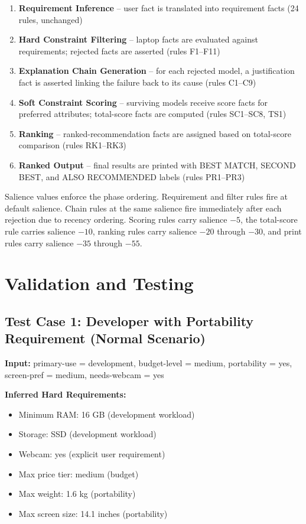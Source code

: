 \documentclass[12pt,a4paper]{article}
\begin{document}
\begin{enumerate}
    \item \textbf{Requirement Inference} -- user fact is translated into requirement facts (24 rules, unchanged)
    \item \textbf{Hard Constraint Filtering} -- laptop facts are evaluated against requirements; rejected facts are asserted (rules F1--F11)
    \item \textbf{Explanation Chain Generation} -- for each rejected model, a justification fact is asserted linking the failure back to its cause (rules C1--C9)
    \item \textbf{Soft Constraint Scoring} -- surviving models receive score facts for preferred attributes; total-score facts are computed (rules SC1--SC8, TS1)
    \item \textbf{Ranking} -- ranked-recommendation facts are assigned based on total-score comparison (rules RK1--RK3)
    \item \textbf{Ranked Output} -- final results are printed with BEST MATCH, SECOND BEST, and ALSO RECOMMENDED labels (rules PR1--PR3)
\end{enumerate}

Salience values enforce the phase ordering. Requirement and filter rules fire at default salience. Chain rules at the same salience fire immediately after each rejection due to recency ordering. Scoring rules carry salience $-5$, the total-score rule carries salience $-10$, ranking rules carry salience $-20$ through $-30$, and print rules carry salience $-35$ through $-55$.

\section{Validation and Testing}

\subsection{Test Case 1: Developer with Portability Requirement (Normal Scenario)}

\textbf{Input:} primary-use = development, budget-level = medium, portability = yes, screen-pref = medium, needs-webcam = yes

\textbf{Inferred Hard Requirements:}
\begin{itemize}
    \item Minimum RAM: 16 GB (development workload)
    \item Storage: SSD (development workload)
    \item Webcam: yes (explicit user requirement)
    \item Max price tier: medium (budget)
    \item Max weight: 1.6 kg (portability)
    \item Max screen size: 14.1 inches (portability)
\end{itemize}
\end{document}
